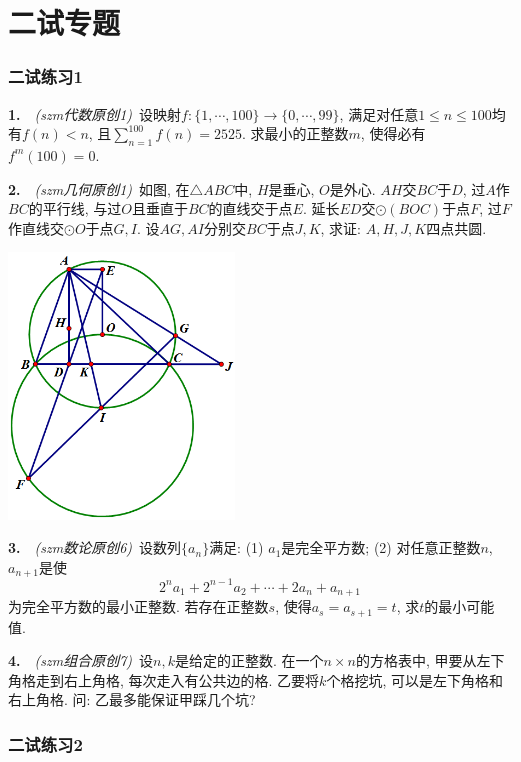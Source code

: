 \chapter{二试专题}

\newpage
\subsection*{二试练习1}

\textbf{1.}~~\textit{(szm代数原创1)}~设映射$f:\{1,\cdots ,100\} \to \{0,\cdots ,99\}$, 满足对任意$1 \leq n \leq 100$均有$f(n)<n$, 且$\sum_{n=1}^{100}f(n)=2525$. 求最小的正整数$m$, 使得必有$f^m(100)=0$. 
\vspace{24em}

\textbf{2.}~~\textit{(szm几何原创1)}~如图, 在$\triangle ABC$中, $H$是垂心, $O$是外心. $AH$交$BC$于$D$, 过$A$作$BC$的平行线, 与过$O$且垂直于$BC$的直线交于点$E$. 延长$ED$交$\odot (BOC)$于点$F$, 过$F$作直线交$\odot O$于点$G,I$. 设$AG,AI$分别交$BC$于点$J,K$, 求证: $A,H,J,K$四点共圆. 

\vspace{2em}
\includegraphics[width=6cm]{attachment/g1.png}


\newpage

\textbf{3.}~~\textit{(szm数论原创6)}~设数列$\{ a_n \}$满足: (1) $a_1$是完全平方数; (2) 对任意正整数$n$, $a_{n+1}$是使$$2^na_1+2^{n-1}a_2+\cdots +2a_n+a_{n+1}$$
为完全平方数的最小正整数. 若存在正整数$s$, 使得$a_s=a_{s+1}=t$, 求$t$的最小可能值. 

\vspace{22em}

\textbf{4.}~~\textit{(szm组合原创7)}~设$n,k$是给定的正整数. 在一个$n \times n$的方格表中, 甲要从左下角格走到右上角格, 每次走入有公共边的格. 乙要将$k$个格挖坑, 可以是左下角格和右上角格. 问: 乙最多能保证甲踩几个坑? 

\newpage
\subsection*{二试练习2}

